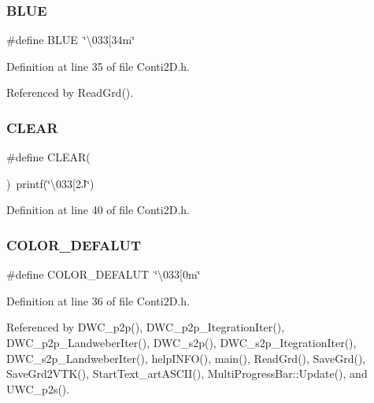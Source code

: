 \subsubsection{B\+L\+UE}
{\footnotesize\ttfamily \#define B\+L\+UE~\char`\"{}\textbackslash{}033[34m\char`\"{}}



Definition at line 35 of file Conti2\+D.\+h.



Referenced by Read\+Grd().

\mbox{\label{Conti2D_8h_aacb71dbc63837c5e60f70180643354b2_aacb71dbc63837c5e60f70180643354b2}} 
\subsubsection{C\+L\+E\+AR}
{\footnotesize\ttfamily \#define C\+L\+E\+AR(\begin{DoxyParamCaption}{ }\end{DoxyParamCaption})~printf(\char`\"{}\textbackslash{}033[2\+J\char`\"{})}



Definition at line 40 of file Conti2\+D.\+h.

\mbox{\label{Conti2D_8h_aa07f331bc3ea046a7f2b28f487d6dfdb_aa07f331bc3ea046a7f2b28f487d6dfdb}} 
\subsubsection{C\+O\+L\+O\+R\+\_\+\+D\+E\+F\+A\+L\+UT}
{\footnotesize\ttfamily \#define C\+O\+L\+O\+R\+\_\+\+D\+E\+F\+A\+L\+UT~\char`\"{}\textbackslash{}033[0m\char`\"{}}



Definition at line 36 of file Conti2\+D.\+h.



Referenced by D\+W\+C\+\_\+p2p(), D\+W\+C\+\_\+p2p\+\_\+\+Itegration\+Iter(), D\+W\+C\+\_\+p2p\+\_\+\+Landweber\+Iter(), D\+W\+C\+\_\+s2p(), D\+W\+C\+\_\+s2p\+\_\+\+Itegration\+Iter(), D\+W\+C\+\_\+s2p\+\_\+\+Landweber\+Iter(), help\+I\+N\+F\+O(), main(), Read\+Grd(), Save\+Grd(), Save\+Grd2\+V\+T\+K(), Start\+Text\+\_\+art\+A\+S\+C\+I\+I(), Multi\+Progress\+Bar\+::\+Update(), and U\+W\+C\+\_\+p2s().

